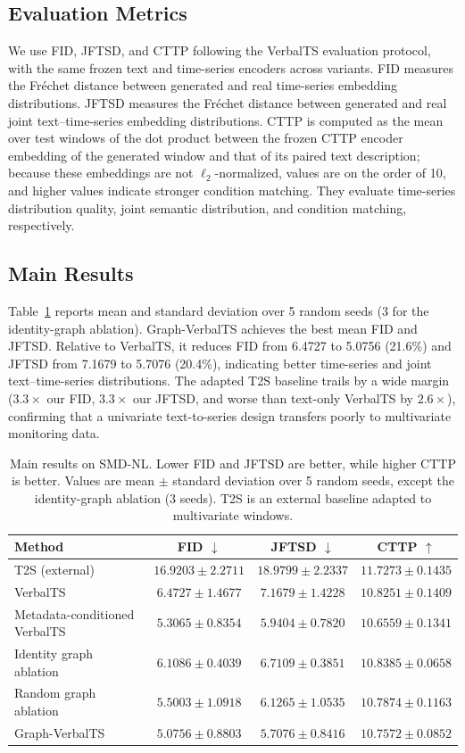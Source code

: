 \documentclass[conference]{IEEEtran}
\begin{document}
\subsection{Evaluation Metrics}

We use FID, JFTSD, and CTTP following the VerbalTS evaluation protocol, with the same frozen text and time-series encoders across variants. FID measures the Fr\'echet distance between generated and real time-series embedding distributions. JFTSD measures the Fr\'echet distance between generated and real joint text--time-series embedding distributions. CTTP is computed as the mean over test windows of the dot product between the frozen CTTP encoder embedding of the generated window and that of its paired text description; because these embeddings are not $\ell_2$-normalized, values are on the order of 10, and higher values indicate stronger condition matching. They evaluate time-series distribution quality, joint semantic distribution, and condition matching, respectively.

\subsection{Main Results}

Table~\ref{tab:main_results} reports mean and standard deviation over 5 random seeds (3 for the identity-graph ablation). Graph-VerbalTS achieves the best mean FID and JFTSD. Relative to VerbalTS, it reduces FID from 6.4727 to 5.0756 (21.6\%) and JFTSD from 7.1679 to 5.7076 (20.4\%), indicating better time-series and joint text--time-series distributions. The adapted T2S baseline trails by a wide margin ($3.3\times$ our FID, $3.3\times$ our JFTSD, and worse than text-only VerbalTS by $2.6\times$), confirming that a univariate text-to-series design transfers poorly to multivariate monitoring data.

\begin{table}[t]
\centering
\caption{Main results on SMD-NL. Lower FID and JFTSD are better, while higher CTTP is better. Values are mean $\pm$ standard deviation over 5 random seeds, except the identity-graph ablation (3 seeds). T2S is an external baseline adapted to multivariate windows.}
\label{tab:main_results}
\begin{tabular}{lccc}
\toprule
Method & FID $\downarrow$ & JFTSD $\downarrow$ & CTTP $\uparrow$ \\
\midrule
T2S (external) & $16.9203\pm2.2711$ & $18.9799\pm2.2337$ & $11.7273\pm0.1435$ \\
VerbalTS & $6.4727\pm1.4677$ & $7.1679\pm1.4228$ & $10.8251\pm0.1409$ \\
Metadata-conditioned VerbalTS & $5.3065\pm0.8354$ & $5.9404\pm0.7820$ & $10.6559\pm0.1341$ \\
Identity graph ablation & $6.1086\pm0.4039$ & $6.7109\pm0.3851$ & $10.8385\pm0.0658$ \\
Random graph ablation & $5.5003\pm1.0918$ & $6.1265\pm1.0535$ & $10.7874\pm0.1163$ \\
Graph-VerbalTS & $\mathbf{5.0756\pm0.8803}$ & $\mathbf{5.7076\pm0.8416}$ & $10.7572\pm0.0852$ \\
\bottomrule
\end{tabular}
\end{table}
\end{document}
